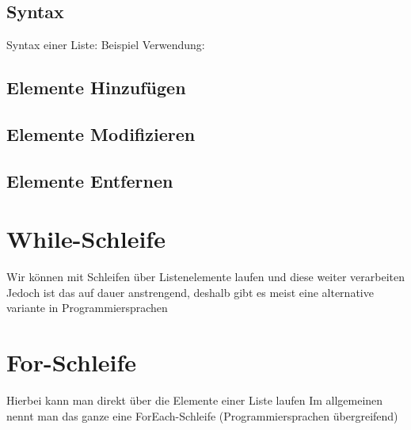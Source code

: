 \subsection{Syntax}
\begin{frame}
    \slidehead
    Syntax einer Liste:
    Beispiel Verwendung:
\end{frame}

\subsection{Elemente Hinzufügen}
\begin{frame}
    \slidehead
\end{frame}

\subsection{Elemente Modifizieren}
\begin{frame}
    \slidehead
\end{frame}

\subsection{Elemente Entfernen}
\begin{frame}
    \slidehead
\end{frame}

\livecoding

\section{While-Schleife}
\subtitle{Schleifen mit Listen}

\begin{frame}[fragile]
    \slidehead
    Wir können mit Schleifen über Listenelemente laufen und diese weiter verarbeiten
    Jedoch ist das auf dauer anstrengend, deshalb gibt es meist eine alternative variante in Programmiersprachen
\end{frame}

\section{For-Schleife}
\begin{frame}[fragile]
    \slidehead
    Hierbei kann man direkt über die Elemente einer Liste laufen
    Im allgemeinen nennt man das ganze eine ForEach-Schleife (Programmiersprachen übergreifend)
\end{frame}


